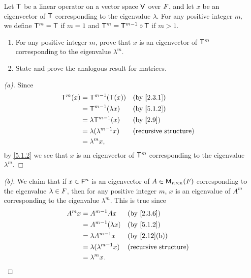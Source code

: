 \begin{ex}\label{ex:5.1.15}
  Let \(\mathsf{T}\) be a linear operator on a vector space \(\mathsf{V}\) over \(\mathit{F}\), and let \(x\) be an eigenvector of \(\mathsf{T}\) corresponding to the eigenvalue \(\lambda\).
  For any positive integer \(m\), we define \(\mathsf{T}^m = \mathsf{T}\) if \(m = 1\) and \(\mathsf{T}^m = \mathsf{T}^{m - 1} \circ \mathsf{T}\) if \(m > 1\).
  \begin{enumerate}
    \item For any positive integer \(m\), prove that \(x\) is an eigenvector of \(\mathsf{T}^m\) corresponding to the eigenvalue \(\lambda^m\).
    \item State and prove the analogous result for matrices.
  \end{enumerate}
\end{ex}

\begin{proof}[(a)]
  Since
  \begin{align*}
    \T^m(x) & = \T^{m - 1}(\T(x))           &  & \text{(by \cref{2.3.1})}     \\
            & = \T^{m - 1}(\lambda x)       &  & \text{(by \cref{5.1.2})}     \\
            & = \lambda \T^{m - 1}(x)       &  & \text{(by \cref{2.9})}       \\
            & = \lambda (\lambda^{m - 1} x) &  & \text{(recursive structure)} \\
            & = \lambda^m x,
  \end{align*}
  by \cref{5.1.2} we see that \(x\) is an eigenvector of \(\mathsf{T}^m\) corresponding to the eigenvalue \(\lambda^m\).
\end{proof}

\begin{proof}[(b)]
  We claim that if \(x \in \mathsf{F}^n\) is an eigenvector of \(A \in \mathsf{M}_{{n} \times n}({\mathit{F}})\) corresponding to the eigenvalue \(\lambda \in \mathit{F}\), then for any positive integer \(m\), \(x\) is an eigenvalue of \(A^m\) corresponding to the eigenvalue \(\lambda^m\).
  This is true since
  \begin{align*}
    A^m x & = A^{m - 1} Ax                &  & \text{(by \cref{2.3.6})}     \\
          & = A^{m - 1}(\lambda x)        &  & \text{(by \cref{5.1.2})}     \\
          & = \lambda A^{m - 1} x         &  & \text{(by \cref{2.12}(b))}   \\
          & = \lambda (\lambda^{m - 1} x) &  & \text{(recursive structure)} \\
          & = \lambda^m x.
  \end{align*}
\end{proof}

